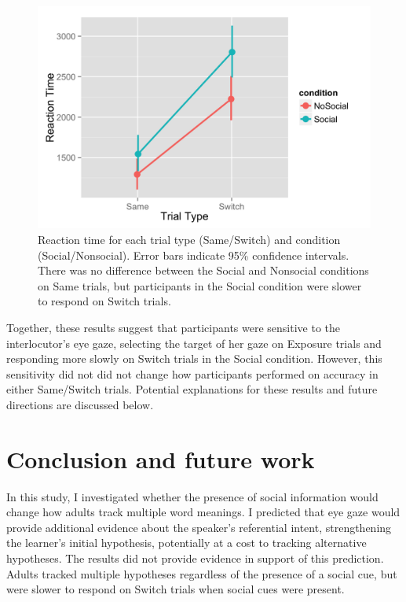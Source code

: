 \documentclass[10pt,letterpaper]{article}
\begin{document}
\begin{figure}[H]
	\centering
	\includegraphics[scale=0.15]{rt.png}
	\caption{Reaction time for each trial type (Same/Switch) and condition (Social/Nonsocial). Error bars indicate 95\% confidence intervals. There was no difference between the Social and Nonsocial conditions on Same trials, but participants in the Social condition were slower to respond on Switch trials.}
\end{figure} 

Together, these results suggest that participants were sensitive to the interlocutor's eye gaze, selecting the target of her gaze on Exposure trials and responding more slowly on Switch trials in the Social condition. However, this sensitivity did not did not change how participants performed on accuracy in either Same/Switch trials. Potential explanations for these results and future directions are discussed below. 

\section{Conclusion and future work}

In this study, I investigated whether the presence of social information would change how adults track multiple word meanings. I predicted that eye gaze would provide additional evidence about the speaker's referential intent, strengthening the learner's initial hypothesis, potentially at a cost to tracking alternative hypotheses. The results did not provide evidence in support of this prediction. Adults tracked multiple hypotheses regardless of the presence of a social cue, but were slower to respond on Switch trials when social cues were present. 
\end{document}
